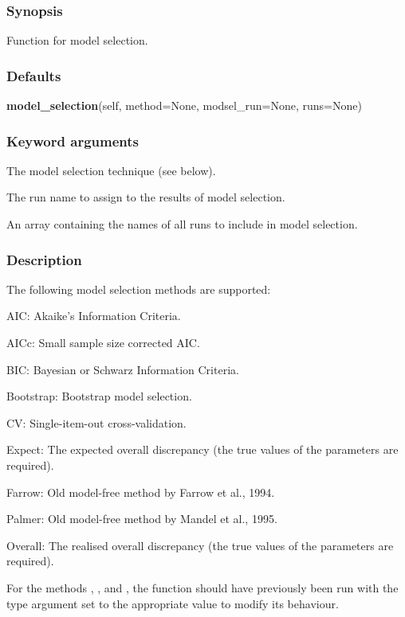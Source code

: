 \subsubsection{Synopsis}

Function for model selection.

\subsubsection{Defaults}

\textsf{\textbf{model\_selection}(self, method=None, modsel\_run=None, runs=None)}


\subsubsection{Keyword arguments}


  The model selection technique (see below).

  The run name to assign to the results of model selection.

  An array containing the names of all runs to include in model selection.

\subsubsection{Description}

The following model selection methods are supported:

AIC:  Akaike's Information Criteria.

AICc:  Small sample size corrected AIC.

BIC:  Bayesian or Schwarz Information Criteria.

Bootstrap:  Bootstrap model selection.

CV:  Single-item-out cross-validation.

Expect:  The expected overall discrepancy (the true values of the parameters are required).

Farrow:  Old model-free method by Farrow et al., 1994.

Palmer:  Old model-free method by Mandel et al., 1995.

Overall:  The realised overall discrepancy (the true values of the parameters are required).

For the methods 
, 
, and 
, the function 
 should have
previously been run with the type argument set to the appropriate value to modify its
behaviour.


